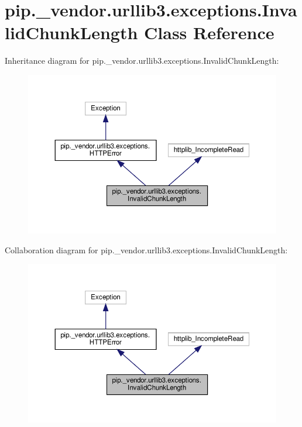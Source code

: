 \hypertarget{classpip_1_1__vendor_1_1urllib3_1_1exceptions_1_1InvalidChunkLength}{}\section{pip.\+\_\+vendor.\+urllib3.\+exceptions.\+Invalid\+Chunk\+Length Class Reference}
\label{classpip_1_1__vendor_1_1urllib3_1_1exceptions_1_1InvalidChunkLength}


Inheritance diagram for pip.\+\_\+vendor.\+urllib3.\+exceptions.\+Invalid\+Chunk\+Length\+:
\nopagebreak
\begin{figure}[H]
\begin{center}
\leavevmode
\includegraphics[width=350pt]{classpip_1_1__vendor_1_1urllib3_1_1exceptions_1_1InvalidChunkLength__inherit__graph}
\end{center}
\end{figure}


Collaboration diagram for pip.\+\_\+vendor.\+urllib3.\+exceptions.\+Invalid\+Chunk\+Length\+:
\nopagebreak
\begin{figure}[H]
\begin{center}
\leavevmode
\includegraphics[width=350pt]{classpip_1_1__vendor_1_1urllib3_1_1exceptions_1_1InvalidChunkLength__coll__graph}
\end{center}
\end{figure}

